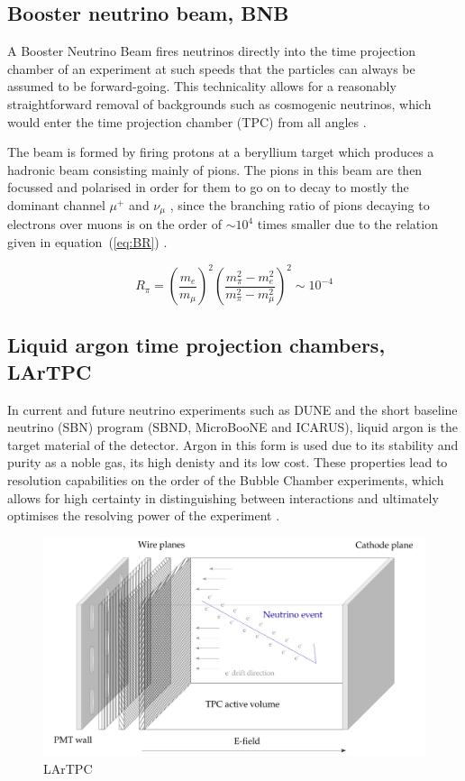 \subsection{Booster neutrino beam, BNB}

A Booster Neutrino Beam fires neutrinos directly into the time projection chamber of an experiment at such speeds that the particles can always be assumed to be forward-going. This technicality allows for a reasonably straightforward removal of backgrounds such as cosmogenic neutrinos, which would enter the time projection chamber (TPC) from all angles \cite{sbn}. 

The beam is formed by firing protons at a beryllium target which produces a hadronic beam consisting mainly of pions. The pions in this beam are then focussed and polarised in order for them to go on to decay to mostly the dominant channel $\mu ^{ + }$ and $\nu _{ \mu }$ \cite{sbn}, since the branching ratio of pions decaying to electrons over muons is on the order of $\sim 10 ^{ 4 }$ times smaller due to the relation given in equation~(\ref{eq:BR}) \cite{BR}.

\begin{equation}\label{eq:BR}
    R_{ \pi } = \left( \dfrac{ m_{ e } }{ m_{ \mu } } \right) ^{2} \left( \dfrac{ m_{ \pi }^{ 2 } - m_{ e } ^{ 2 } }{ m_{ \pi } ^{ 2 } - m_{ \mu } ^{ 2 } } \right) ^{ 2 } \sim 10^{-4}
\end{equation}

    
\subsection{Liquid argon time projection chambers, LArTPC}     
    
    In current and future neutrino experiments such as DUNE and the short baseline neutrino (SBN) program (SBND, MicroBooNE and ICARUS), liquid argon is the target material of the detector. Argon in this form is used due to its stability and purity as a noble gas, its high denisty and its low cost. These properties lead to resolution capabilities on the order of the Bubble Chamber experiments, which allows for high certainty in distinguishing between interactions and ultimately optimises the resolving power of the experiment \cite{larRes}.


    \begin{figure}[h!]
        \center
        \includegraphics[width=\textwidth]{images/LArTPC.pdf}
        \caption{LArTPC}
        \label{fig:lartpc}
    \end{figure}

